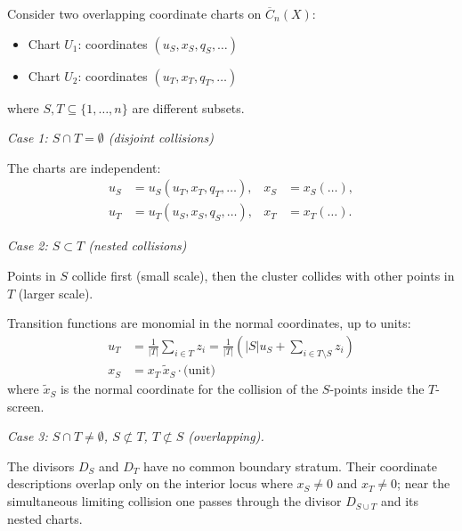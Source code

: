 \begin{proposition}\label{prop:transition-functions}
Consider two overlapping coordinate charts on $\overline{C}_n(X)$:
\begin{itemize}
\item Chart $U_1$: coordinates $(u_S,x_S,q_S,\ldots)$
\item Chart $U_2$: coordinates $(u_T,x_T,q_T,\ldots)$
\end{itemize}

where $S, T \subseteq \{1,\ldots,n\}$ are different subsets.

\emph{Case 1: $S \cap T = \emptyset$ (disjoint collisions)}

The charts are independent:
\begin{align}
u_S &= u_S(u_T,x_T,q_T,\ldots),&
x_S&=x_S(\ldots),\\
u_T &= u_T(u_S,x_S,q_S,\ldots),&
x_T&=x_T(\ldots).
\end{align}

\emph{Case 2: $S \subset T$ (nested collisions)}

Points in $S$ collide first (small scale), then the cluster collides with other points
in $T$ (larger scale).

Transition functions are monomial in the normal coordinates, up to
units:
\begin{align}
u_T &= \frac{1}{|T|} \sum_{i \in T} z_i = \frac{1}{|T|}\left( |S| u_S + \sum_{i \in T \setminus S} z_i \right)\\
x_S&=x_T\,\widetilde x_S\cdot \text{(unit)}
\end{align}
where $\widetilde x_S$ is the normal coordinate for the collision of
the $S$-points inside the $T$-screen.

\emph{Case 3: $S \cap T \neq \emptyset$, $S \not\subset T$, $T \not\subset S$ (overlapping).}

The divisors $D_S$ and $D_T$ have no common boundary stratum. Their
coordinate descriptions overlap only on the interior locus where
$x_S\neq0$ and $x_T\neq0$; near the simultaneous limiting collision one
passes through the divisor $D_{S\cup T}$ and its nested charts.
\end{proposition}

